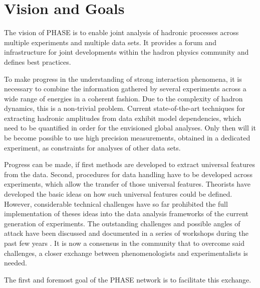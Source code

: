 \section{Vision and Goals}

The vision of PHASE is to enable joint analysis of hadronic processes across multiple experiments and multiple data sets. It provides a forum and infrastructure for joint developments within the hadron physics community and defines best practices.

To make progress in the understanding of strong interaction phenomena, it is necessary to combine the information gathered by several experiments across a wide range of energies in a coherent fashion. Due to the complexity of hadron dynamics, this is a non-trivial problem. Current state-of-the-art techniques for extracting hadronic amplitudes from data exhibit model dependencies, which need to be quantified in order for the envisioned global analyses. Only then will it be become possible to use high precision measurements, obtained in a dedicated experiment, as constraints for analyses of other data sets. 

Progress can be made, if first methods are developed to extract universal features from the data. Second, procedures for data handling have to be developed across experiments, which allow the transfer of those universal features. Theorists have developed the basic ideas on how such universal features could be defined. However, considerable technical challenges have so far prohibited the full implementation of theses ideas into the data analysis frameworks of the current generation of experiments. The outstanding challenges and possible angles of attack have been discussed and documented in a series of workshops during the past few years \cite{Battaglieri_2015, Brice_o_2016, Lutz_2016}. It is now a consensus in the community that to overcome said challenges, a closer exchange between phenomenologists and experimentalists is needed.

The first and foremost goal of the PHASE network is to facilitate this exchange. 




